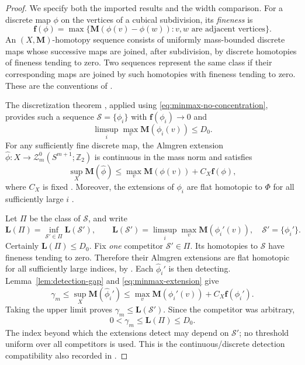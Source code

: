 \begin{proof}
We specify both the imported results and the width comparison. For
a discrete map $\phi$ on the vertices of a cubical subdivision,
its \emph{fineness} is
\[
 \mathbf f(\phi)=\max\{
   \mathbf M(\phi(v)-\phi(w)):v,w\text{ are adjacent vertices}\}.
\]
An $(X,\mathbf M)$-homotopy sequence consists of uniformly
mass-bounded discrete maps whose successive maps are joined, after
subdivision, by discrete homotopies of fineness tending to zero.
Two sequences represent the same class if their corresponding maps
are joined by such homotopies with fineness tending to zero. These
are the conventions of
\cite[\S\S2.2--2.6, pp.~6--7]{MarquesNeves2017}.

The discretization theorem
\cite[Theorem~3.9, p.~13]{MarquesNeves2017}, applied using
\eqref{eq:minmax-no-concentration}, provides such a sequence
$\mathcal S=\{\phi_i\}$ with $\mathbf f(\phi_i)\to0$ and
\[
 \limsup_i\max_v\mathbf M(\phi_i(v))\le D_0.
\]
For any sufficiently fine discrete map, the Almgren extension
$\widehat\phi:X\to\mathcal Z_m^0(S^{m+1};\mathbb Z_2)$ is
continuous in the mass norm and satisfies
\begin{equation}\label{eq:minmax-extension}
 \sup_X\mathbf M(\widehat\phi)
 \le\max_v\mathbf M(\phi(v))+C_X\mathbf f(\phi),
\end{equation}
where $C_X$ is fixed
\cite[Theorem~3.10, p.~14]{MarquesNeves2017}.
Moreover, the extensions of $\phi_i$ are flat homotopic to
$\Phi$ for all sufficiently large $i$
\cite[Corollary~3.12(ii), p.~15]{MarquesNeves2017}.

Let $\Pi$ be the class of $\mathcal S$, and write
\[
 \mathbf L(\Pi)=\inf_{\mathcal S'\in\Pi}\mathbf L(\mathcal S'),
 \qquad
 \mathbf L(\mathcal S')=
   \limsup_i\max_v\mathbf M(\phi_i'(v)),
 \quad \mathcal S'=\{\phi_i'\}.
\]
Certainly $\mathbf L(\Pi)\le D_0$. Fix \emph{one} competitor
$\mathcal S'\in\Pi$. Its homotopies to $\mathcal S$ have
fineness tending to zero. Therefore their Almgren extensions are
flat homotopic for all sufficiently large indices, by
\cite[Corollary~3.12(i), p.~15]{MarquesNeves2017}. Each
$\widehat\phi_i'$ is then detecting. Lemma~\ref{lem:detection-gap}
and \eqref{eq:minmax-extension} give
\[
 \gamma_m\le\sup_X\mathbf M(\widehat\phi_i')
 \le\max_v\mathbf M(\phi_i'(v))+C_X\mathbf f(\phi_i').
\]
Taking the upper limit proves
$\gamma_m\le\mathbf L(\mathcal S')$. Since the competitor was
arbitrary,
\[
 0<\gamma_m\le\mathbf L(\Pi)\le D_0.
\]
The index beyond which the extensions detect may depend on
$\mathcal S'$; no threshold uniform over all competitors is used.
This is the continuous/discrete detection compatibility also
recorded in \cite[Lemma~4.6, p.~16]{MarquesNeves2017}.


\end{proof}
